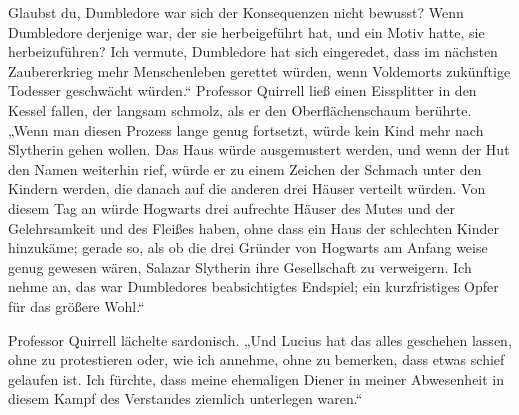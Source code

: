 Glaubst du, Dumbledore war sich der Konsequenzen nicht bewusst? Wenn Dumbledore derjenige war, der sie herbeigeführt hat, und ein Motiv hatte, sie herbeizuführen? Ich vermute, Dumbledore hat sich eingeredet, dass im nächsten Zaubererkrieg mehr Menschenleben gerettet würden, wenn Voldemorts zukünftige Todesser geschwächt würden.“
Professor Quirrell ließ einen Eissplitter in den Kessel fallen, der langsam schmolz, als er den Oberflächenschaum berührte.
„Wenn man diesen Prozess lange genug fortsetzt, würde kein Kind mehr nach Slytherin gehen wollen. Das Haus würde ausgemustert werden, und wenn der Hut den Namen weiterhin rief, würde er zu einem Zeichen der Schmach unter den Kindern werden, die danach auf die anderen drei Häuser verteilt würden. Von diesem Tag an würde Hogwarts drei aufrechte Häuser des Mutes und der Gelehrsamkeit und des Fleißes haben, ohne dass ein Haus der schlechten Kinder hinzukäme; gerade so, als ob die drei Gründer von Hogwarts am Anfang weise genug gewesen wären, Salazar Slytherin ihre Gesellschaft zu verweigern. Ich nehme an, das war Dumbledores beabsichtigtes Endspiel; ein kurzfristiges Opfer für das größere Wohl.“

Professor Quirrell lächelte sardonisch.
„Und Lucius hat das alles geschehen lassen, ohne zu protestieren oder, wie ich annehme, ohne zu bemerken, dass etwas schief gelaufen ist. Ich fürchte, dass meine ehemaligen Diener in meiner Abwesenheit in diesem Kampf des Verstandes ziemlich unterlegen waren.“

